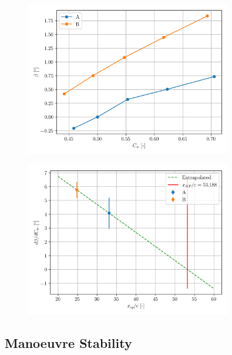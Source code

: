 \documentclass{article}
\begin{document}
\begin{figure}[H]
    \centering
    \includegraphics[width=0.8\textwidth]{Longitudinal_Static_Stability_3.png}
    \caption{}
    \label{fig:Longitudinal_Static_Stability_3}
\end{figure}
\begin{figure}[H]
    \centering
    \includegraphics[width=0.8\textwidth]{Longitudinal_Static_Stability_4.png}
    \caption{}
    \label{fig:Longitudinal_Static_Stability_4}
\end{figure}

\subsection{Manoeuvre Stability}
\end{document}
